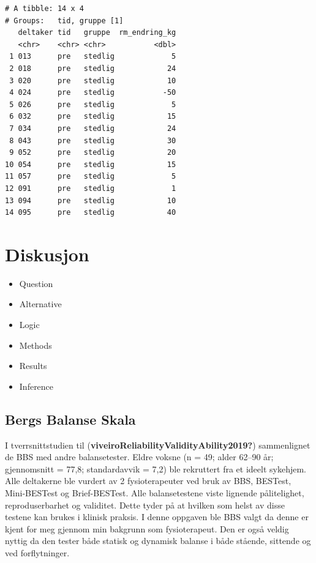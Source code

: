\documentclass[
  letterpaper,
  DIV=11,
  numbers=noendperiod]{scrreprt}
\providecommand{\tightlist}{%
  \setlength{\itemsep}{0pt}\setlength{\parskip}{0pt}}\usepackage{longtable,booktabs,array}
\begin{document}
\begin{verbatim}
# A tibble: 14 x 4
# Groups:   tid, gruppe [1]
   deltaker tid   gruppe  rm_endring_kg
   <chr>    <chr> <chr>           <dbl>
 1 013      pre   stedlig             5
 2 018      pre   stedlig            24
 3 020      pre   stedlig            10
 4 024      pre   stedlig           -50
 5 026      pre   stedlig             5
 6 032      pre   stedlig            15
 7 034      pre   stedlig            24
 8 043      pre   stedlig            30
 9 052      pre   stedlig            20
10 054      pre   stedlig            15
11 057      pre   stedlig             5
12 091      pre   stedlig             1
13 094      pre   stedlig            10
14 095      pre   stedlig            40
\end{verbatim}


\hypertarget{diskusjon}{%
\chapter{Diskusjon}\label{diskusjon}}

\begin{itemize}
\tightlist
\item
  Question
\item
  Alternative
\item
  Logic
\item
  Methods
\item
  Results
\item
  Inference
\end{itemize}

\hypertarget{bergs-balanse-skala}{%
\section{Bergs Balanse Skala}\label{bergs-balanse-skala}}

I tverrsnittstudien til
(\textbf{viveiroReliabilityValidityAbility2019?}) sammenlignet de BBS
med andre balansetester. Eldre voksne (n = 49; alder 62--90 år;
gjennomsnitt = 77,8; standardavvik = 7,2) ble rekruttert fra et ideelt
sykehjem. Alle deltakerne ble vurdert av 2 fysioterapeuter ved bruk av
BBS, BESTest, Mini-BESTest og Brief-BESTest. Alle balansetestene viste
lignende pålitelighet, reproduserbarhet og validitet. Dette tyder på at
hvilken som helst av disse testene kan brukes i klinisk praksis. I denne
oppgaven ble BBS valgt da denne er kjent for meg gjennom min bakgrunn
som fysioterapeut. Den er også veldig nyttig da den tester både statisk
og dynamisk balanse i både stående, sittende og ved forflytninger.
\end{document}
